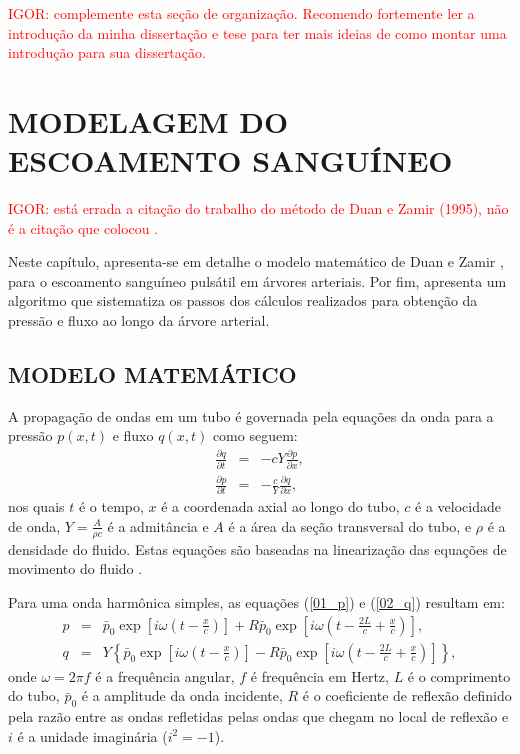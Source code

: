 \documentclass[a4paper,12pt]{monografia}
\theoremstyle{plain}
\theoremstyle{definition}
\theoremstyle{remark}
\begin{document}
\textcolor{red}{IGOR: complemente esta seção de organização. Recomendo fortemente ler a introdução da minha dissertação e tese para ter mais ideias de como montar uma introdução para sua dissertação.}

\chapter{MODELAGEM DO ESCOAMENTO SANGUÍNEO}\label{sec:modelagem_escoamento}

\textcolor{red}{IGOR: está errada a citação do trabalho do método de Duan e Zamir (1995), não é a citação que colocou \cite{Duan}.}

Neste capítulo, apresenta-se em detalhe o modelo matemático de Duan e Zamir \cite{Duan1992}, para o escoamento sanguíneo pulsátil em árvores arteriais. Por fim, apresenta um algoritmo que sistematiza os passos dos cálculos realizados para obtenção da pressão e fluxo ao longo da árvore arterial.

\section{MODELO MATEMÁTICO}\label{sec:modelo_matematico}

A propagação de ondas em um tubo é governada pela equações da onda para a pressão $p(x,t)$ e fluxo $q(x,t)$ como seguem:
\begin{eqnarray}
	\frac{\partial q}{\partial t} &=& -cY \frac{\partial p}{\partial x},
	\label{01_p}\\
	\frac{\partial p}{\partial t} &=& -\frac{c}{Y} \frac{\partial q}{\partial x}, 
	\label{02_q}
\end{eqnarray}
nos quais $t$ é o tempo, $x$ é a coordenada axial ao longo do tubo, $c$ é a velocidade de onda, $Y = \frac{A}{\rho c}$ é a admitância e $A$ é a área da seção transversal do tubo, e $\rho$ é a densidade do fluido. Estas equações são baseadas na linearização das equações de movimento do fluido \cite{Fung,Lighthill}. 

Para uma onda harmônica simples, as equações (\ref{01_p}) e (\ref{02_q}) resultam em:
\begin{eqnarray}
	p &=& \bar{p}_0 \exp\left[i\omega\left(t - \frac{x}{c}\right)\right] + R  \bar{p}_0 \exp\left[i\omega\left(t - \frac{2L}{c} + \frac{x}{c}\right)\right],
	\label{03_p}\\
	q &=& Y\left\{\bar{p}_0 \exp\left[i\omega\left(t - \frac{x}{c}\right)\right] -  R  \bar{p}_0 \exp\left[i\omega\left(t - \frac{2L}{c} + \frac{x}{c}\right)\right]\right\},
	\label{04_1}
\end{eqnarray}
onde $\omega = 2 \pi f$ é a frequência angular, $f$ é frequência em Hertz, $L$ é o comprimento do tubo, $\bar{p}_0$ é a amplitude da onda incidente, $R$ é o coeficiente de reflexão definido pela razão entre as ondas refletidas pelas ondas que chegam no local de reflexão \cite{Fung,Karreman} e $i$ é a unidade imaginária ($i^2 = -1$).
\end{document}

